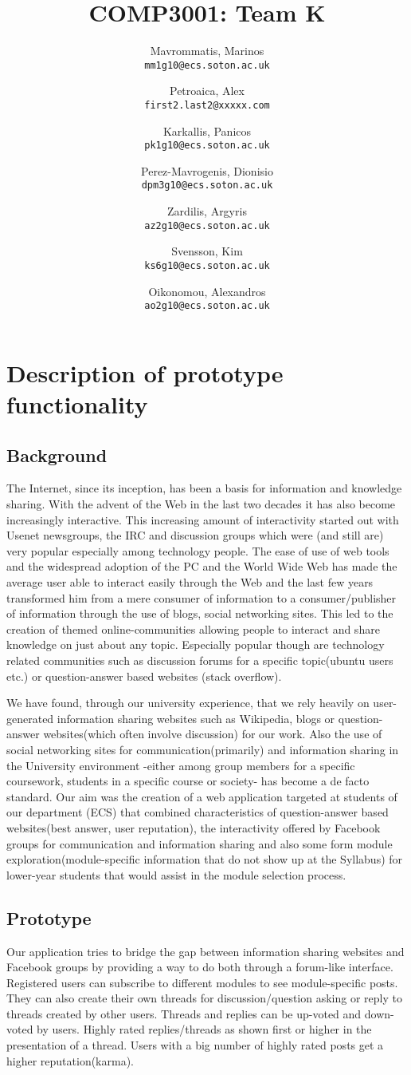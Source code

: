 \documentclass[12pt,a4paper,titlepage]{article}
\author{
  Mavrommatis, Marinos\\ 
\texttt{mm1g10@ecs.soton.ac.uk}
\and
Petroaica, Alex\\ 
\texttt{first2.last2@xxxxx.com}
\and
Karkallis, Panicos\\ 
\texttt{pk1g10@ecs.soton.ac.uk}
\and
Perez-Mavrogenis, Dionisio\\
 \texttt{dpm3g10@ecs.soton.ac.uk}
\and
Zardilis, Argyris\\
 \texttt{az2g10@ecs.soton.ac.uk}
\and
Svensson, Kim\\
 \texttt{ks6g10@ecs.soton.ac.uk}
\and
Oikonomou, Alexandros\\
 \texttt{ao2g10@ecs.soton.ac.uk}
}
\title{COMP3001: Team K}
\begin{document}
\maketitle

\section{Description of prototype functionality}
\subsection{Background}
The Internet, since its inception, has been a basis for information and knowledge sharing. With the advent of the Web in the last two decades it has also become increasingly interactive. This increasing amount of interactivity started out with Usenet newsgroups, the IRC and discussion groups which were (and still are) very popular especially among technology people. The ease of use of web tools and the widespread adoption of the PC and the World Wide Web has made the average user able to interact easily through the Web and the last few years transformed him from a mere consumer of information to a consumer/publisher of information through the use of blogs, social networking sites.  This led to the creation of themed online-communities allowing people to interact and share knowledge on just about any topic. Especially popular though are technology related communities such as discussion forums for a specific topic(ubuntu users etc.) or question-answer based websites (stack overflow).

We have found, through our university experience, that we rely heavily on user-generated information sharing websites such as Wikipedia, blogs or question-answer websites(which often involve discussion) for our work. Also the use of social networking sites for communication(primarily) and information sharing in the University environment -either among group members for a specific coursework, students in a specific course or society- has become a de facto standard. Our aim was the creation of a web application targeted at students of our department (ECS) that combined characteristics of question-answer based websites(best answer, user reputation), the interactivity offered by Facebook groups for communication and information sharing and also some form module exploration(module-specific information that do not show up at the Syllabus) for lower-year students that would assist in the module selection process.
\subsection{Prototype}
Our application tries to bridge the gap between information sharing websites and Facebook groups by providing a way to do both through a forum-like interface.  Registered users can subscribe to different modules to see module-specific posts. They can also create their own threads for discussion/question asking or reply to threads created by other users. Threads and replies can be up-voted and down-voted by users. Highly rated replies/threads as shown first or higher in the presentation of a thread.  Users with a big number of highly rated posts get a higher reputation(karma).
\end{document}
